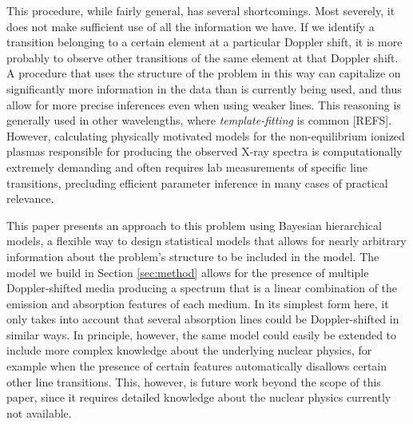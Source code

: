 \documentclass[12pt]{emulateapj}
\begin{document}
This procedure, while fairly general, has several shortcomings. Most severely, it does not make sufficient use of all the information we have. If we identify a transition belonging to a certain element at a particular Doppler shift, it is more probably to observe other transitions of the same element at that Doppler shift. A procedure that uses the structure of the problem in this way can capitalize on significantly more information in the data than is currently being used, and thus allow for more precise inferences even when using weaker lines. This reasoning is generally used in other wavelengths, where \textit{template-fitting} is common [REFS]. However, calculating physically motivated models for the non-equilibrium ionized plasmas responsible for producing the observed X-ray spectra is computationally extremely demanding and often requires lab measurements of specific line transitions, precluding efficient parameter inference in many cases of practical relevance.

This paper presents an approach to this problem using Bayesian hierarchical models, a flexible way to design statistical models that allows for nearly arbitrary information about the problem's structure to be included in the model. The model we build in Section \ref{sec:method} allows for the presence of multiple Doppler-shifted media producing a spectrum that is a linear combination of the emission and absorption features of each medium. In its simplest form here, it only takes into account that several absorption lines could be Doppler-shifted in similar ways. In principle, however, the same model could easily be extended to include more complex knowledge about the underlying nuclear physics, for example when the presence of certain features automatically disallows certain other line transitions. This, however, is future work beyond the scope of this paper, since it requires detailed knowledge about the nuclear physics currently not available. 

\end{document}
